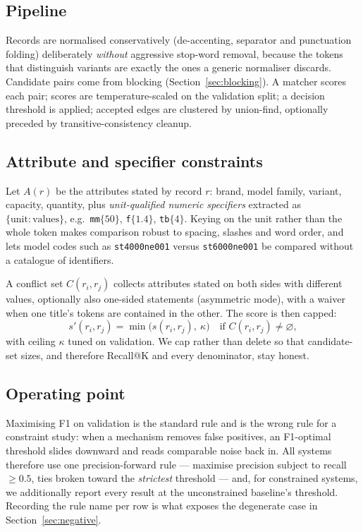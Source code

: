 \documentclass[conference]{IEEEtran}
\begin{document}
\subsection{Pipeline}
Records are normalised conservatively (de-accenting, separator and punctuation folding) deliberately
\emph{without} aggressive stop-word removal, because the tokens that distinguish variants are exactly the
ones a generic normaliser discards. Candidate pairs come from blocking (Section~\ref{sec:blocking}). A
matcher scores each pair; scores are temperature-scaled on the validation split; a decision threshold is
applied; accepted edges are clustered by union-find, optionally preceded by transitive-consistency cleanup.

\subsection{Attribute and specifier constraints}
Let $A(r)$ be the attributes stated by record $r$: brand, model family, variant, capacity, quantity, plus
\emph{unit-qualified numeric specifiers} extracted as $\{\text{unit}: \text{values}\}$, e.g.\
\texttt{mm}$\{50\}$, \texttt{f}$\{1.4\}$, \texttt{tb}$\{4\}$. Keying on the unit rather than the whole token
makes comparison robust to spacing, slashes and word order, and lets model codes such as
\texttt{st4000ne001} versus \texttt{st6000ne001} be compared without a catalogue of identifiers.

A conflict set $C(r_i,r_j)$ collects attributes stated on both sides with different values, optionally also
one-sided statements (asymmetric mode), with a waiver when one title's tokens are contained in the other.
The score is then capped:
\begin{equation}
s'(r_i,r_j)=\min\big(s(r_i,r_j),\ \kappa\big)\quad\text{if } C(r_i,r_j)\neq\varnothing,
\end{equation}
with ceiling $\kappa$ tuned on validation. We cap rather than delete so that candidate-set sizes, and
therefore Recall@K and every denominator, stay honest.

\subsection{Operating point}
Maximising F1 on validation is the standard rule and is the wrong rule for a constraint study: when a
mechanism removes false positives, an F1-optimal threshold slides downward and reads comparable noise back
in. All systems therefore use one precision-forward rule --- maximise precision subject to
recall $\ge 0.5$, ties broken toward the \emph{strictest} threshold --- and, for constrained systems, we
additionally report every result at the unconstrained baseline's threshold. Recording the rule name per row
is what exposes the degenerate case in Section~\ref{sec:negative}.
\end{document}
